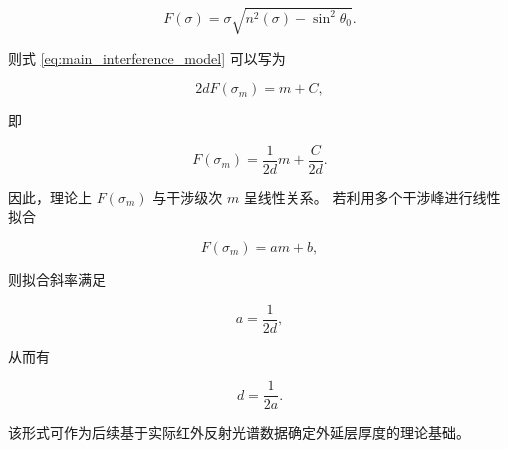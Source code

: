 \documentclass[UTF8,12pt,a4paper]{ctexart}
\begin{document}
\begin{equation}
    F(\sigma)
    =
    \sigma
    \sqrt{
    n^2(\sigma)-\sin^2\theta_0
    }.
    \label{eq:F_sigma}
\end{equation}

则式 \eqref{eq:main_interference_model} 可以写为

\begin{equation}
    2dF(\sigma_m)
    =
    m+C,
\end{equation}

即

\begin{equation}
    F(\sigma_m)
    =
    \frac{1}{2d}m
    +
    \frac{C}{2d}.
    \label{eq:linear_model}
\end{equation}

因此，理论上 $F(\sigma_m)$ 与干涉级次 $m$ 呈线性关系。
若利用多个干涉峰进行线性拟合

\begin{equation}
    F(\sigma_m)=am+b,
\end{equation}

则拟合斜率满足

\begin{equation}
    a=\frac{1}{2d},
\end{equation}

从而有

\begin{equation}
    \boxed{
    d=\frac{1}{2a}
    }.
    \label{eq:thickness_fit}
\end{equation}

该形式可作为后续基于实际红外反射光谱数据确定外延层厚度的理论基础。
\end{document}
